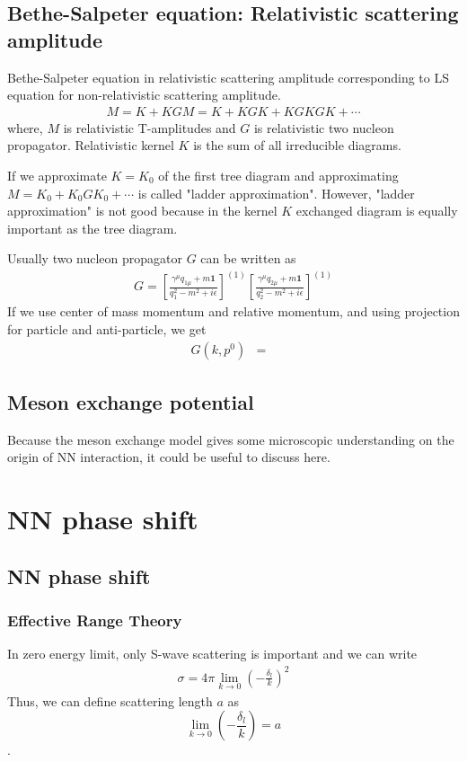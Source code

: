 \documentclass[10pt]{book}
\def\bm{\boldsymbol}
\newcommand{\bea}{\begin{eqnarray}}
\newcommand{\eea}{\end{eqnarray}}
\begin{document}
\section{Bethe-Salpeter equation: Relativistic scattering amplitude}
Bethe-Salpeter equation in relativistic scattering amplitude 
corresponding to LS equation for non-relativistic scattering amplitude.
\bea 
M=K+KGM=K+KGK+KGKGK+\cdots 
\eea 
where, $M$ is relativistic T-amplitudes and 
$G$ is relativistic two nucleon propagator. Relativistic kernel $K$ is the sum of 
all irreducible diagrams. 

If we approximate $K=K_0$ of the first tree diagram and approximating
$M=K_0+K_0GK_0+\cdots$ is called "ladder approximation". However, "ladder approximation"
is not good because in the kernel $K$ exchanged diagram is equally important 
as the tree diagram. 

Usually two nucleon propagator $G$ can be written as
\bea 
G=\left[\frac{\gamma^\mu q_{1\mu}  +m{\bm 1}}{ q_1^2-m^2+i\epsilon} \right]^{(1)}
  \left[\frac{\gamma^\mu q_{2\mu}  +m{\bm 1}}{ q_2^2-m^2+i\epsilon} \right]^{(1)}
\eea 
If we use center of mass momentum and relative momentum,
and using projection for particle and anti-particle, we get
\bea
G(k,p^0)&=&
\eea 

\section{Meson exchange potential} 
Because the meson exchange model gives some microscopic understanding on the 
origin of NN interaction, it could be useful to discuss here.
 




\chapter{NN phase shift}

\section{NN phase shift}
\subsection{Effective Range Theory}
In zero energy limit, only S-wave scattering is important and we can write
\bea 
\sigma=4\pi \lim_{k\to 0}(-\frac{\delta_l}{k} )^2
\eea 
Thus, we can define scattering length $a$ as 
$$\lim_{k\to 0}(-\frac{\delta_l}{k} )=a$$. 
\end{document}
